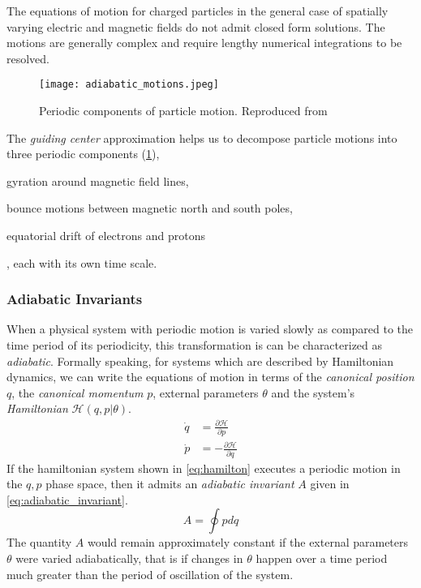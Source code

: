 The equations of motion for charged particles in the general case of spatially varying electric and 
magnetic fields do not admit closed form solutions. The motions are generally complex and require 
lengthy numerical integrations to be resolved.
%
\begin{figure}[ht]
    \centering\texttt{[image: adiabatic\_motions.jpeg]}
    \caption{
        {\small 
        Periodic components of particle motion. Reproduced from \citet{roederer2012dynamics}
        }
    }
    \label{fig:particlemotions}
\end{figure}
%

The \emph{guiding center} approximation helps us to decompose particle motions into three periodic 
components (\cref{fig:particlemotions}),
%
\begin{enumerate*}
    \item gyration around magnetic field lines, 
    \item bounce motions between magnetic north and south poles, 
    \item equatorial drift of electrons and protons
\end{enumerate*}
%
, each with its own time scale.

\subsubsection*{Adiabatic Invariants}

When a physical system with periodic motion is varied slowly as compared to the time period of 
its periodicity, this transformation is can be characterized as \emph{adiabatic}. 
Formally speaking, for systems which are described by Hamiltonian dynamics, we can write the 
equations of motion in terms of the \emph{canonical position} $q$, the \emph{canonical momentum} 
$p$, external parameters $\theta$ and the system's \emph{Hamiltonian} $\mathcal{H}(q,p|\theta)$. 
%
\begin{align}\label{eq:hamilton}
    \dot q &= \frac{\partial \mathcal{H}}{\partial p}\\
    \dot p &= - \frac{\partial \mathcal{H}}{\partial q}
\end{align}
%
If the hamiltonian system shown in \cref{eq:hamilton} executes a periodic motion in the $q,p$ phase 
space, then it admits an \emph{adiabatic invariant} $A$ given in \cref{eq:adiabatic_invariant}.
%
\begin{equation}\label{eq:adiabatic_invariant}
    A = \oint p d q
\end{equation}
%
The quantity $A$ would remain approximately constant if the external parameters $\theta$ were 
varied adiabatically, that is if changes in $\theta$ happen over a time period much greater than 
the period of oscillation of the system.

